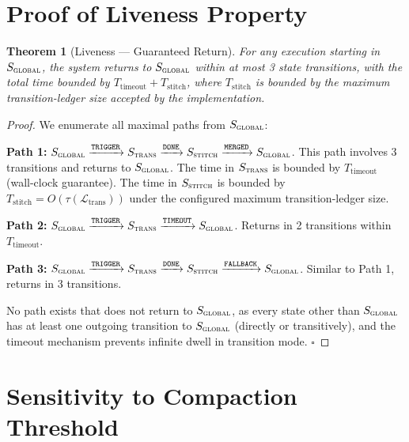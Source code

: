 \documentclass[10pt,twocolumn]{article}
\newtheorem{theorem}{Theorem}
\newcommand{\Dtok}{\tau}
\begin{document}
\section{Proof of Liveness Property}\label{app:liveness}

\begin{theorem}[Liveness --- Guaranteed Return]
  For any execution starting in $S_{\textsc{global}}$, the system returns to $S_{\textsc{global}}$ within at most 3 state transitions, with the total time bounded by $T_{\mathrm{timeout}} + T_{\mathrm{stitch}}$, where $T_{\mathrm{stitch}}$ is bounded by the maximum transition-ledger size accepted by the implementation.
\end{theorem}

\begin{proof}
  We enumerate all maximal paths from $S_{\textsc{global}}$:

  \textbf{Path 1:} $S_{\textsc{global}} \xrightarrow{\texttt{TRIGGER}} S_{\textsc{trans}} \xrightarrow{\texttt{DONE}} S_{\textsc{stitch}} \xrightarrow{\texttt{MERGED}} S_{\textsc{global}}$. This path involves 3 transitions and returns to $S_{\textsc{global}}$. The time in $S_{\textsc{trans}}$ is bounded by $T_{\mathrm{timeout}}$ (wall-clock guarantee). The time in $S_{\textsc{stitch}}$ is bounded by $T_{\mathrm{stitch}} = O(\Dtok(\mathcal{L}_{\mathrm{trans}}))$ under the configured maximum transition-ledger size.

  \textbf{Path 2:} $S_{\textsc{global}} \xrightarrow{\texttt{TRIGGER}} S_{\textsc{trans}} \xrightarrow{\texttt{TIMEOUT}} S_{\textsc{global}}$. Returns in 2 transitions within $T_{\mathrm{timeout}}$.

  \textbf{Path 3:} $S_{\textsc{global}} \xrightarrow{\texttt{TRIGGER}} S_{\textsc{trans}} \xrightarrow{\texttt{DONE}} S_{\textsc{stitch}} \xrightarrow{\texttt{FALLBACK}} S_{\textsc{global}}$. Similar to Path 1, returns in 3 transitions.

  No path exists that does not return to $S_{\textsc{global}}$, as every state other than $S_{\textsc{global}}$ has at least one outgoing transition to $S_{\textsc{global}}$ (directly or transitively), and the timeout mechanism prevents infinite dwell in transition mode. $\square$
\end{proof}


\section{Sensitivity to Compaction Threshold}\label{app:threshold}
\end{document}
